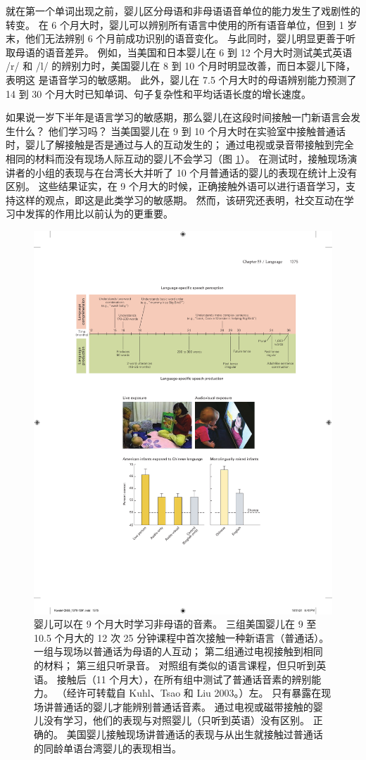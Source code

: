 就在第一个单词出现之前，婴儿区分母语和非母语语音单位的能力发生了戏剧性的转变。 在 6 个月大时，婴儿可以辨别所有语言中使用的所有语音单位，但到 1 岁末，他们无法辨别 6 个月前成功识别的语音变化。 与此同时，婴儿明显更善于听取母语的语音差异。 例如，当美国和日本婴儿在 6 到 12 个月大时测试美式英语 /r/ 和 /l/ 的辨别力时，美国婴儿在 8 到 10 个月时明显改善，而日本婴儿下降，表明这 是语音学习的敏感期。 此外，婴儿在 7.5 个月大时的母语辨别能力预测了 14 到 30 个月大时已知单词、句子复杂性和平均话语长度的增长速度。

如果说一岁下半年是语言学习的敏感期，那么婴儿在这段时间接触一门新语言会发生什么？ 他们学习吗？ 当美国婴儿在 9 到 10 个月大时在实验室中接触普通话时，婴儿了解接触是否是通过与人的互动发生的； 通过电视或录音带接触到完全相同的材料而没有现场人际互动的婴儿不会学习（图 \ref{fig:55_3}）。 在测试时，接触现场演讲者的小组的表现与在台湾长大并听了 10 个月普通话的婴儿的表现在统计上没有区别。 这些结果证实，在 9 个月大的时候，正确接触外语可以进行语音学习，支持这样的观点，即这是此类学习的敏感期。 然而，该研究还表明，社交互动在学习中发挥的作用比以前认为的更重要。

\begin{figure}[htbp]
	\centering
	\includegraphics[width=0.7\linewidth]{chap55/fig_55_3}
	\caption{婴儿可以在 9 个月大时学习非母语的音素。 三组美国婴儿在 9 至 10.5 个月大的 12 次 25 分钟课程中首次接触一种新语言（普通话）。 一组与现场以普通话为母语的人互动； 第二组通过电视接触到相同的材料； 第三组只听录音。 对照组有类似的语言课程，但只听到英语。 接触后（11 个月大），在所有组中测试了普通话音素的辨别能力。 （经许可转载自 Kuhl、Tsao 和 Liu 2003。）左。 只有暴露在现场讲普通话的婴儿才能辨别普通话音素。 通过电视或磁带接触的婴儿没有学习，他们的表现与对照婴儿（只听到英语）没有区别。 正确的。 美国婴儿接触现场讲普通话的表现与从出生就接触过普通话的同龄单语台湾婴儿的表现相当。}
	\label{fig:55_3}
\end{figure}

